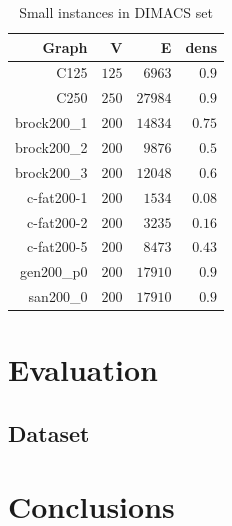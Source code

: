 \documentclass[draft,final]{vutinfth} %
\begin{document}
\begin{table}
\begin{center}
    \begin{tabular}{ rrrr } 
        Graph &   V &  E & dens \\ \hline
        C125 &  $125$ &    $6963$ &  $0.9$ \\
        C250 &  $250$ &   $27984$ &  $0.9$ \\
brock200\_1 &  $200$ &   $14834$ &  $0.75$ \\
brock200\_2 &  $200$ &    $9876$ & $0.5$ \\
brock200\_3 &  $200$ &   $12048$ &   $0.6$ \\
c-fat200-1 &  $200$ &    $1534$ &  $0.08$ \\
c-fat200-2 &  $200$ &    $3235$ & $0.16$ \\
c-fat200-5 &  $200$ &    $8473$ & $0.43$ \\
gen200\_p0 &  $200$ &   $17910$ & $0.9$ \\
san200\_0 &  $200$ &   $17910$ & $0.9$ \\
    \end{tabular}
    \caption{Small instances in DIMACS set}
    \label{tab:first-approach}
\end{center}
\end{table}

\chapter{Evaluation}

\section{Dataset}



\chapter{Conclusions}

\backmatter

\listoffigures %

\cleardoublepage %
\listoftables %

\listofalgorithms
{}

\printindex

\printglossaries



\end{document}
